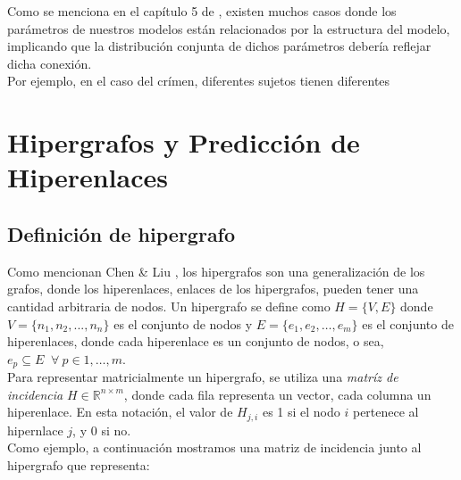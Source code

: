 Como se menciona en el capítulo 5 de \cite{gelman2013bayesian}, existen muchos casos donde los parámetros de nuestros modelos están relacionados por la estructura del modelo, implicando que la distribución conjunta de dichos parámetros debería reflejar dicha conexión.\\

Por ejemplo, en el caso del crímen, diferentes sujetos tienen diferentes 

\section{Hipergrafos y Predicción de Hiperenlaces}

\subsection{Definición de hipergrafo}

Como mencionan Chen \& Liu \cite{Chen_2024}, los hipergrafos son una generalización de los grafos, donde los hiperenlaces, enlaces de los hipergrafos, pueden tener una cantidad arbitraria de nodos.
Un hipergrafo se define como \begin{math} H = \{V,E\}\end{math} donde $V=\{n_{1},n_{2},...,n_{n}\}$ es el conjunto de nodos y $E=\{e_{1},e_{2},\dots,e_{m}\}$ es el conjunto de hiperenlaces, donde cada hiperenlace es un conjunto de nodos, o sea, $e_{p} \subseteq E \; \; \forall \: p \in 1,\dots,m$.\\

Para representar matricialmente un hipergrafo, se utiliza una \textit{matríz de incidencia} $H \in \mathbb{R}^{n \times m}$, donde cada fila representa un vector, cada columna un hiperenlace. En esta notación, el valor de $H_{j,i}$ es 1 si el nodo $i$ pertenece al hipernlace $j$, y 0 si no.\\

Como ejemplo, a continuación mostramos una matriz de incidencia junto al hipergrafo que representa:\\

